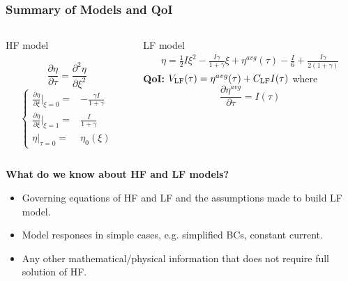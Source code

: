 \documentclass[10pt,xcolor=dvipsnames,compress]{beamer}
\begin{document}
\begin{frame}
\frametitle{Summary of Models and QoI}
\vfill

\begin{columns}
\begin{column}{.35\textwidth} 
\begin{problock}{HF model}

\begin{equation*}\label{eq:HF}
\frac{\partial\eta}{\partial\tau} = \frac{\partial^2\eta}{\partial\xi^2}
\end{equation*}
\begin{equation*}
\left\{\begin{matrix}
\frac{\partial\eta}{\partial\xi}|_{\xi=0} = & -\frac{\gamma I}{1+\gamma}\\
\frac{\partial\eta}{\partial\xi}|_{\xi=1} = & \frac{I}{1+\gamma} \nonumber\\
\eta|_{\tau=0} 	 =  & \eta_0(\xi)
\end{matrix}\right.
\end{equation*}

\end{problock}
\end{column}
\begin{column}{.6\textwidth}
\begin{block}{LF model}
\begin{eqnarray*}
\eta = 
\frac{1}{2}I\xi^2 - \frac{I \gamma}{1+\gamma}\xi +
{\eta}^{avg}(\tau) - \frac{I}{6} + \frac{I\gamma}{2(1+\gamma)}
\end{eqnarray*}
%
\textbf{QoI:}
$
V_{\rm LF}(\tau) = {\eta}^{avg}(\tau) + C_{\rm LF} I(\tau)
$
where
\begin{equation*}
\frac{\partial{\eta}^{avg}}{\partial\tau} = I(\tau)
\end{equation*}
\end{block}

\end{column}
\end{columns}


\begin{center}
\textbf{What do we know about HF and LF models?}
\end{center}

\begin{itemize}
\item Governing equations of HF and LF and the assumptions made to build LF model.
\item Model responses in simple cases, e.g. simplified BCs, constant current. 
\item Any other mathematical/physical information that does not require full solution of HF.


\end{itemize}



\vfill
\end{frame}
\end{document}
